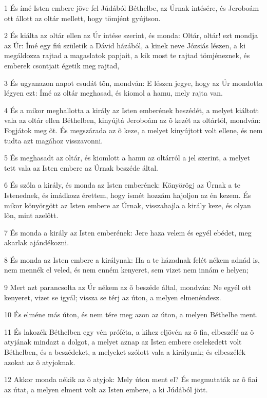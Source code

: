 \par 1 És ímé Isten embere jöve fel Júdából Béthelbe, az Úrnak intésére, és Jeroboám ott állott az oltár mellett, hogy tömjént gyújtson.
\par 2 És kiálta az oltár ellen az Úr intése szerint, és monda: Oltár, oltár! ezt mondja az Úr: Ímé egy fiú születik a Dávid házából, a kinek neve Józsiás lészen, a ki megáldozza rajtad a magaslatok papjait, a kik most te rajtad tömjéneznek, és emberek csontjait égetik meg rajtad,
\par 3 És ugyanazon napot csudát tõn, mondván: E lészen jegye, hogy az Úr mondotta légyen ezt: Ímé az oltár meghasad, és kiomol a hamu, mely rajta van.
\par 4 És a mikor meghallotta a király az Isten emberének beszédét, a melyet kiáltott vala az oltár ellen Béthelben, kinyújtá Jeroboám az õ kezét az oltártól, mondván: Fogjátok meg õt. És megszárada az õ keze, a melyet kinyújtott volt ellene, és nem tudta azt magához visszavonni.
\par 5 És meghasadt az oltár, és kiomlott a hamu az oltárról a jel szerint, a melyet tett vala az Isten embere az Úrnak beszéde által.
\par 6 És szóla a király, és monda az Isten emberének: Könyörögj az Úrnak a te Istenednek, és imádkozz érettem, hogy ismét hozzám hajoljon az én kezem. És mikor könyörgött az Isten embere az Úrnak, visszahajla a király keze, és olyan lõn, mint azelõtt.
\par 7 És monda a király az Isten emberének: Jere haza velem és egyél ebédet, meg akarlak ajándékozni.
\par 8 És monda az Isten embere a királynak: Ha a te házadnak felét nékem adnád is, nem mennék el veled, és nem enném kenyeret, sem vizet nem innám e helyen;
\par 9 Mert azt parancsolta az Úr nékem az õ beszéde által, mondván: Ne egyél ott kenyeret, vizet se igyál; vissza se térj az úton, a melyen elmenéndesz.
\par 10 És elméne más úton, és nem tére meg azon az úton, a melyen Béthelbe ment.
\par 11 És lakozék Béthelben egy vén próféta, a kihez eljövén az õ fia, elbeszélé az õ atyjának mindazt a dolgot, a melyet aznap az Isten embere cselekedett volt Béthelben, és a beszédeket, a melyeket szólott vala a királynak; és elbeszélék azokat az õ atyjoknak.
\par 12 Akkor monda nékik az õ atyjok: Mely úton ment el? És megmutaták az õ fiai az útat, a melyen elment volt az Isten embere, a ki Júdából jött.
